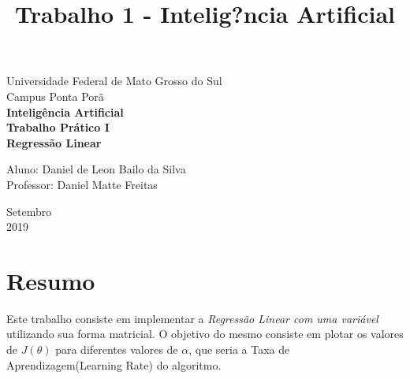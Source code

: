 \documentclass[a4paper, 12pt]{article}
\title{Trabalho 1 - Intelig?ncia Artificial}
\begin{document}
\begin{titlepage}
    \begin{center}
		\LARGE{Universidade Federal de Mato Grosso do Sul}\\
		\vspace{5pt}
        \large{Campus Ponta Porã}\\ 
        \large{{\textbf{Inteligência Artificial}}}\\ 
        \vspace{15pt}
        \vspace{95pt}
        \textbf{\large{Trabalho Prático I}}\\
        \vspace{15pt}
        \textbf{\LARGE{Regressão Linear}}\\
        \vspace{3,5cm}
    \end{center}
    
    \begin{flushleft}
        \begin{tabbing}
            Aluno: Daniel de Leon Bailo da Silva\\            
            Professor: Daniel Matte Freitas\\
    \end{tabbing}
 \end{flushleft}
    \vspace{1cm}
    
    \begin{center}
        \vspace{\fill}
            Setembro\\
         2019
            \end{center}
\end{titlepage}

\clearpage
\tableofcontents
\thispagestyle{empty}
\clearpage


\section*{Resumo}
\label{sec:resumo}
Este trabalho consiste em implementar a \textit{Regressão Linear com uma variável} utilizando sua forma matricial.
O objetivo do mesmo consiste em plotar os valores de $J(\theta)$ para diferentes valores de $\alpha$, que seria a Taxa
de Aprendizagem(Learning Rate) do algoritmo. \\
\end{document}
